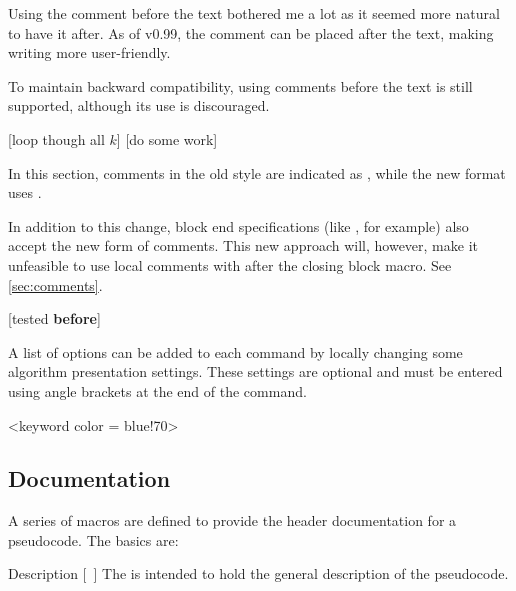 \documentclass[a4paper, 11pt]{article}
\begin{document}
Using the comment before the text bothered me a lot as it seemed more natural to have it after. As of v0.99, the comment can be placed after the text, making writing more user-friendly.

To maintain backward compatibility, using comments before the text is still supported, although its use is discouraged.

\begin{tcblisting}{}
    \begin{algorithmic}
        [loop though all $k$]
            [do some work]
        \EndWhile
    \end{algorithmic}
\end{tcblisting}

In this section, comments in the old style are indicated as , while the new format uses .

In addition to this change, block end specifications (like , for example) also accept the new form of comments. This new approach will, however, make it unfeasible to use local comments with  after the closing block macro. See \cref{sec:comments}.

\begin{tcblisting}{}
    \begin{algorithmic}
            [tested \textbf{before}]
    \end{algorithmic}
\end{tcblisting}

A list of options can be added to each command by locally changing some algorithm presentation settings. These settings are optional and must be entered using angle brackets at the end of the command.

\begin{tcblisting}{}
    \begin{algorithmic}
            <keyword color = blue!70>
            \EndWhile
        \EndIf
    \end{algorithmic}
\end{tcblisting}

\subsection{Documentation}
A series of macros are defined to provide the header documentation for a pseudocode. The basics are:
\begin{macro}{Description}
    [~]
    The  is intended to hold the general description of the pseudocode.
\end{macro}
\end{document}
